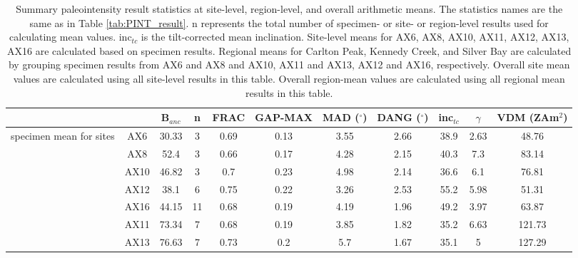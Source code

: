 \documentclass[9pt,twoside,lineno]{pnas-new}
\begin{document}
\begin{table}[]
\centering
\caption{\footnotesize{Summary paleointensity result statistics at site-level, region-level, and overall arithmetic means. The statistics names are the same as in Table \ref{tab:PINT_result}}. n represents the total number of specimen- or site- or region-level results used for calculating mean values. inc$_{tc}$ is the tilt-corrected mean inclination. Site-level means for AX6, AX8, AX10, AX11, AX12, AX13, AX16 are calculated based on specimen results. Regional means for Carlton Peak, Kennedy Creek, and Silver Bay are calculated by grouping specimen results from AX6 and AX8 and AX10, AX11 and AX13, AX12 and AX16, respectively. Overall site mean values are calculated using all site-level results in this table. Overall region-mean values are calculated using all regional mean results in this table. }
\begin{tabular}{ccccccccccc}
\hline
\multicolumn{1}{l}{}                       &               & B$_{anc}$ & n  & FRAC & GAP-MAX & MAD ($^\circ$) & DANG ($^\circ$) & inc$_{tc}$ & $\gamma$ & VDM (ZAm$^2$) \\
\hline
\multirow{7}{*}{specimen mean for sites}   & AX6           & 30.33     & 3  & 0.69 & 0.13    & 3.55           & 2.66            & 38.9       & 2.63     & 48.76         \\
                                           & AX8           & 52.4      & 3  & 0.66 & 0.17    & 4.28           & 2.15            & 40.3       & 7.3      & 83.14         \\
                                           & AX10          & 46.82     & 3  & 0.7  & 0.23    & 4.98           & 2.14            & 36.6       & 6.1      & 76.81         \\
                                           & AX12          & 38.1      & 6  & 0.75 & 0.22    & 3.26           & 2.53            & 55.2       & 5.98     & 51.31         \\
                                           & AX16          & 44.15     & 11 & 0.68 & 0.19    & 4.19           & 1.96            & 49.2       & 3.97     & 63.87         \\
                                           & AX11          & 73.34     & 7  & 0.68 & 0.19    & 3.85           & 1.82            & 35.2       & 6.63     & 121.73        \\
                                           & AX13          & 76.63     & 7  & 0.73 & 0.2     & 5.7            & 1.67            & 35.1       & 5        & 127.29        \\ 

\end{tabular}
\end{table}
\end{document}
